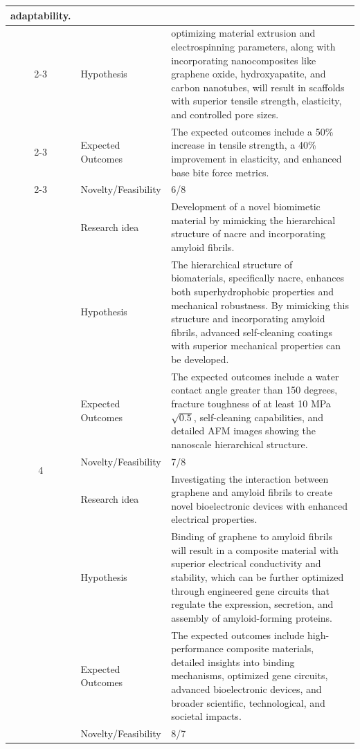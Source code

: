 \documentclass{article}
\begin{document}
\begin{table}[th!]
\begin{tabularx}{\textwidth}{|c|m{}|m{}|}
adaptability.
\\
\cline{2-3}
& Hypothesis & optimizing material extrusion and electrospinning parameters, along with incorporating nanocomposites like graphene oxide, hydroxyapatite, and carbon nanotubes, will
result in scaffolds with superior tensile strength, elasticity, and controlled pore sizes.
\\
\cline{2-3}
& Expected Outcomes & The expected outcomes include a 50\% increase in tensile strength, a 40\% improvement in elasticity, and
enhanced base bite force metrics.
\\
\cline{2-3}
& Novelty/Feasibility & 6/8  
\\
\hline
\multirow{9}{*}{4}  
& Research idea & Development of a novel biomimetic material by mimicking the hierarchical structure of nacre and incorporating amyloid fibrils.
\\
\cline{2-3}
& Hypothesis & The hierarchical structure of biomaterials, specifically nacre, enhances both superhydrophobic properties and mechanical robustness. By mimicking this structure and
incorporating amyloid fibrils, advanced self-cleaning coatings with superior mechanical properties can be developed.
\\
\cline{2-3}
& Expected Outcomes & The expected outcomes include a water contact angle greater than 150 degrees, fracture toughness of at least 10 MPa$\sqrt{0.5}$, self-cleaning capabilities, and detailed AFM
images showing the nanoscale hierarchical structure.
\\
\cline{2-3}
& Novelty/Feasibility & 7/8  
\\
\hline
\multirow{10}{*}{5}  
& Research idea & Investigating the interaction between graphene and amyloid fibrils to create novel bioelectronic devices with enhanced electrical properties.
\\
\cline{2-3}
& Hypothesis & Binding of graphene to amyloid fibrils will result in a composite material with superior electrical conductivity and stability, which can be further optimized through engineered gene
circuits that regulate the expression, secretion, and assembly of amyloid-forming proteins.
\\
\cline{2-3}
& Expected Outcomes & The expected outcomes include high-performance composite materials, detailed insights into binding mechanisms, optimized gene circuits, advanced bioelectronic devices, and broader scientific, technological, and societal
impacts.
\\
\cline{2-3}
& Novelty/Feasibility & 8/7  
\\
\hline
\end{tabularx}
\label{tbl:research_ideas}
\end{table}
\end{document}
